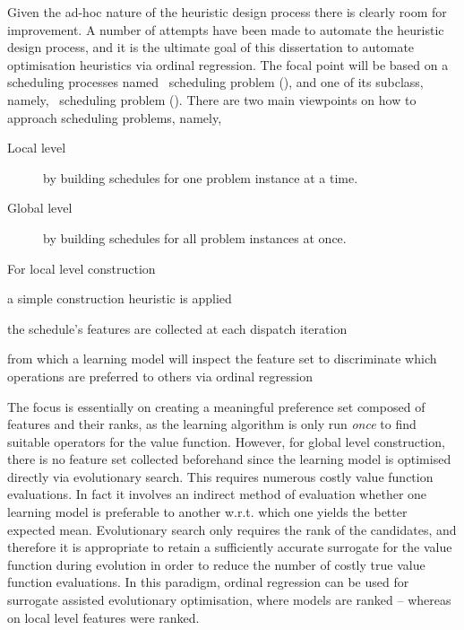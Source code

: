 Given the ad-hoc nature of the heuristic design process there is clearly room 
for improvement. A number of attempts have been made to automate the heuristic 
design process, and it is the ultimate goal of this dissertation to automate 
optimisation heuristics via ordinal regression. 
The focal point will be based on a scheduling processes named \jsp\ scheduling 
problem (\JSP), and one of its subclass, namely, \fsp\ scheduling problem 
(\FSP).
There are two main viewpoints on how to approach scheduling problems, namely,
\begin{description}
  \item[Local level] by building schedules for one problem instance at a time.
  \item[Global level] by building schedules for all problem instances at once.
\end{description}
For local level construction
\begin{enumerate*}[label={{}}]
  \item a simple construction heuristic is applied 
  \item the schedule's features are collected at each dispatch iteration
  \item from which a learning model will inspect the feature set to 
  discriminate which operations are preferred to others via ordinal regression 
\end{enumerate*}
The focus is essentially on creating a meaningful preference set composed of 
features and their ranks, as the learning algorithm is only run \emph{once} to 
find suitable operators for the value function. 
However, for global level construction, there is no feature set collected 
beforehand since the learning model is optimised directly via evolutionary 
search. This requires numerous costly value function evaluations. 
In fact it involves an indirect method of evaluation whether one learning model 
is preferable to another w.r.t. which one yields the better expected mean. 
Evolutionary search only requires the rank of the candidates, and therefore it 
is appropriate to retain a sufficiently accurate surrogate for the value 
function during evolution in order to reduce the number of costly true value 
function evaluations. 
In this paradigm, ordinal regression can be used for surrogate assisted 
evolutionary optimisation, where models are ranked -- whereas on local level 
features were ranked. 

